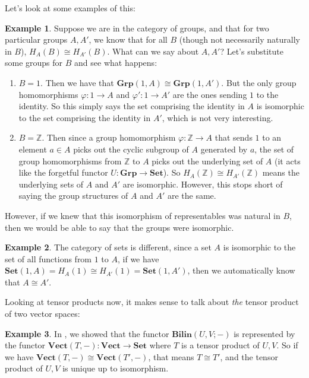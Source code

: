 \documentclass[11pt]{article}
\theoremstyle{definition}
\theoremstyle{definition}
\newtheorem{ex}{Example}
\theoremstyle{plain}
\theoremstyle{plain}
\theoremstyle{plain}
\begin{document}
Let's look at some examples of this:

\begin{ex}
Suppose we are in the category of groups, and that for two particular groups $A,A'$, we know that for all $B$ (though not necessarily naturally in $B$), $H_A(B) \cong H_{A'}(B)$. What can we say about $A, A'$? Let's substitute some groups for $B$ and see what happens:

\begin{enumerate}
\item $B = 1$. Then we have that $\textbf{Grp}(1, A) \cong \textbf{Grp}(1, A')$. But the only group homomorphisms $\varphi: 1 \to A$ and $\varphi' : 1 \to A'$ are the ones sending $1$ to the identity. So this simply says the set comprising the identity in $A$ is isomorphic to the set comprising the identity in $A'$, which is not very interesting.
\item $B = \mathbb{Z}$. Then since a group homomorphism $\varphi: \mathbb{Z} \to A$ that sends $1$ to an element $a \in A$ picks out the cyclic subgroup of $A$ generated by $a$, the set of group homomorphisms from $\mathbb{Z}$ to $A$ picks out the underlying set of $A$ (it acts like the forgetful functor $U: \textbf{Grp} \to \textbf{Set}$). So $H_A(\mathbb{Z}) \cong H_{A'}(\mathbb{Z})$ means the underlying sets of $A$ and $A'$ are isomorphic. However, this stops short of saying the group structures of $A$ and $A'$ are the same.
\end{enumerate}

However, if we knew that this isomorphism of representables was natural in $B$, then we would be able to say that the groups were isomorphic.
\end{ex}

\begin{ex}
The category of sets is different, since a set $A$ is isomorphic to the set of all functions from $1$ to $A$, if we have $\textbf{Set}(1, A) = H_A(1) \cong H_{A'}(1) = \textbf{Set}(1, A')$, then we automatically know that $A \cong A'$.
\end{ex}

Looking at tensor products now, it makes sense to talk about \emph{the} tensor product of two vector spaces:

\begin{ex}
In \cite{liu_tensorproducts_2018}, we showed that the functor $\textbf{Bilin}(U,V;-)$ is represented by the functor $\textbf{Vect}(T, -): \textbf{Vect} \to \textbf{Set}$ where $T$ is a tensor product of $U, V$. So if we have $\textbf{Vect}(T, -) \cong \textbf{Vect}(T', -)$, that means $T \cong T'$, and the tensor product of $U, V$ is unique up to isomorphism.
\end{ex}
\end{document}
